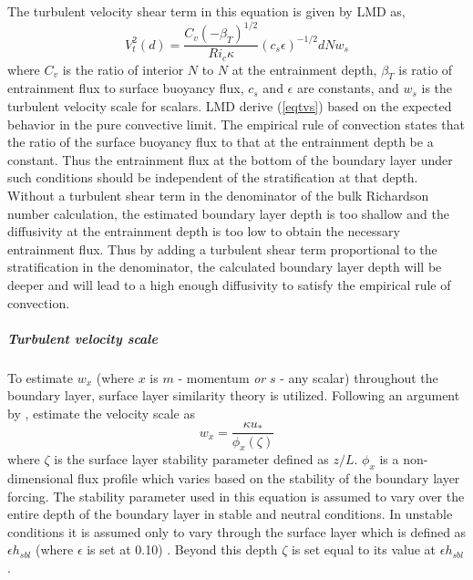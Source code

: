 The turbulent velocity shear term in this equation is given by LMD as,
\begin{equation}
  V_{t}^{2}(d)=\frac{C_v(-\beta_T)^{1/2}}{Ri_c
  \kappa}(c_s\epsilon)^{-1/2}dNw_s
  \label{eqtvs}
\end{equation}
where $C_v$ is the ratio of interior $N$ to $N$ at the entrainment
depth, $\beta_T$ is ratio of entrainment flux to surface buoyancy flux,
$c_s$ and $\epsilon$ are constants, and $w_s$ is the turbulent velocity
scale for scalars.
LMD derive (\ref{eqtvs}) based on the expected behavior in the pure
convective limit.  The empirical rule of convection states that the
ratio of the surface buoyancy flux to that at the entrainment depth be 
a constant.  Thus the entrainment flux at the
bottom of the boundary layer under such conditions should be
independent of the stratification at that depth.  Without a turbulent
shear term in the denominator of the bulk Richardson number
calculation, the estimated boundary layer depth is too shallow and the
diffusivity at the entrainment depth is too low to obtain the
necessary entrainment flux.  Thus by adding a turbulent shear term
proportional to the stratification in the denominator, the calculated
boundary layer depth will be deeper and will lead to a high enough
diffusivity to satisfy the empirical rule of convection.
  
\subparagraph{Turbulent velocity scale}
To estimate $w_x$ (where $x$ is $m$ - momentum {\em or} $s$
- any scalar) throughout the boundary layer, surface layer similarity
theory is utilized.  Following an argument by
\cite{TM86}, \cite{Large94} estimate the velocity scale as
\begin{equation}
w_x=\frac{\kappa u_*}{\phi_x(\zeta)}
\end{equation}
where $\zeta$ is the surface layer stability parameter defined as
$z/L$.  $\phi_x$ is a non-dimensional flux profile which varies based
on the stability of the boundary layer forcing.  The stability
parameter used in this equation is assumed to vary over the entire
depth of the boundary layer in stable and neutral conditions.  In
unstable conditions it is assumed only to vary through the surface
layer which is defined as $ \epsilon h_{sbl} $ (where $\epsilon$ is
set at 0.10) .  Beyond this depth $\zeta$
is set equal to its value at $ \epsilon h_{sbl} $.


